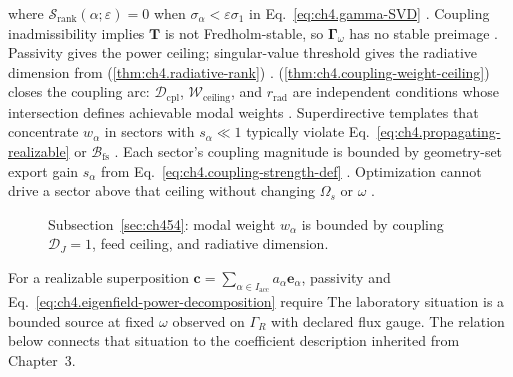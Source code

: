 where \(\mathcal{S}_{\mathrm{rank}}(\alpha;\varepsilon)=0\) when \(\sigma_{\alpha}<\varepsilon\sigma_{1}\) in
Eq.~\eqref{eq:ch4.gamma-SVD} \cite{devaney2004}.
Coupling inadmissibility implies \(\mathbf{T}\) is not Fredholm-stable, so \(\boldsymbol{\Gamma}_\omega\) has no stable
preimage \cite{harrington2001}. Passivity gives the power ceiling; singular-value threshold gives the radiative dimension from
(\ref{thm:ch4.radiative-rank}) \cite{stratton1941}.
(\ref{thm:ch4.coupling-weight-ceiling}) closes the coupling arc: \(\mathcal{D}_{\mathrm{cpl}}\),
\(\mathcal{W}_{\mathrm{ceiling}}\), and \(r_{\mathrm{rad}}\) are independent conditions whose intersection defines achievable
modal weights \cite{hansen1988}. Superdirective templates that concentrate \(w_{\alpha}\) in sectors with
\(s_{\alpha}\ll1\) typically violate Eq.~\eqref{eq:ch4.propagating-realizable} or \(\mathcal{B}_{\mathrm{fs}}\)
\cite{devaney2004}.
Each sector's coupling magnitude is bounded by geometry-set export gain $s_\alpha$ from Eq.~\eqref{eq:ch4.coupling-strength-def} \cite{harrington2001}. Optimization cannot drive a sector above that ceiling without changing $\Omega_s$ or $\omega$ \cite{stratton1941}.
\begin{figure}[t]
\centering
{}
\caption{Subsection~\ref{sec:ch454}: modal weight \(w_{\alpha}\) is bounded by coupling $\mathcal{D}_J=1$, feed ceiling, and
radiative dimension.}
\label{fig:ch4.modal-weight-ceiling}
\end{figure}
For a realizable superposition \(\mathbf{c}=\sum_{\alpha\in I_{\mathrm{acc}}}a_{\alpha}\mathbf{e}_{\alpha}\),
passivity and Eq.~\eqref{eq:ch4.eigenfield-power-decomposition} require
The laboratory situation is a bounded source at fixed $\omega$ observed on $\Gamma_R$ with declared flux gauge. The relation below connects that situation to the coefficient description inherited from Chapter~3. \cite{stratton1941}
